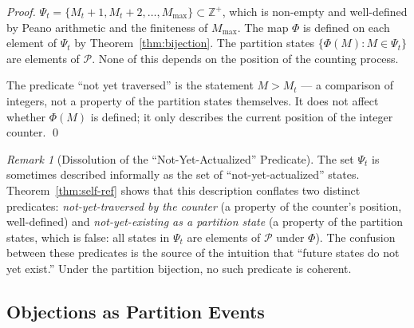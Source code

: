 \documentclass[twocolumn,10pt,a4paper]{article}
\theoremstyle{thmstyle}
\theoremstyle{definition}
\theoremstyle{remark}
\newtheorem{remark}[theorem]{Remark}
\newcommand{\Zp}{\mathbb{Z}^{+}}
\newcommand{\Parts}{\mathcal{P}}
\newcommand{\Mmax}{M_{\max}}
\newcommand{\PhiMap}{\varPhi}
\begin{document}
\begin{proof}
$\Psi_t = \{M_t + 1, M_t + 2, \ldots, \Mmax\} \subset \Zp$, which is non-empty and well-defined by Peano arithmetic and the finiteness of $\Mmax$. The map $\PhiMap$ is defined on each element of $\Psi_t$ by Theorem~\ref{thm:bijection}. The partition states $\{\PhiMap(M) : M \in \Psi_t\}$ are elements of $\Parts$. None of this depends on the position of the counting process.

The predicate ``not yet traversed'' is the statement $M > M_t$ --- a comparison of integers, not a property of the partition states themselves. It does not affect whether $\PhiMap(M)$ is defined; it only describes the current position of the integer counter. \qed
\end{proof}

\begin{remark}[Dissolution of the ``Not-Yet-Actualized'' Predicate]
The set $\Psi_t$ is sometimes described informally as the set of ``not-yet-actualized'' states. Theorem~\ref{thm:self-ref} shows that this description conflates two distinct predicates: \emph{not-yet-traversed by the counter} (a property of the counter's position, well-defined) and \emph{not-yet-existing as a partition state} (a property of the partition states, which is false: all states in $\Psi_t$ are elements of $\Parts$ under $\PhiMap$). The confusion between these predicates is the source of the intuition that ``future states do not yet exist.'' Under the partition bijection, no such predicate is coherent.
\end{remark}

\subsection{Objections as Partition Events}
\end{document}
